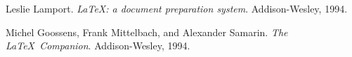 \clearpage
{}
\begin{thebibliography}{9}
	 Leslie Lamport.
		\emph{\LaTeX: a document preparation system}. Addison-Wesley, 1994.
	
	 Michel Goossens, Frank Mittelbach, and Alexander Samarin. \emph{The \LaTeX\ Companion}.
		Addison-Wesley, 1994.
\end{thebibliography}